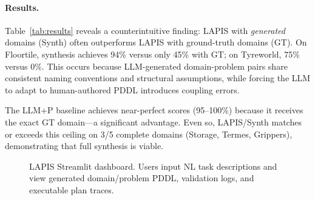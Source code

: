 \documentclass[letterpaper]{article}
\begin{document}
\paragraph{Results.}
Table~\ref{tab:results} reveals a counterintuitive finding: LAPIS with \emph{generated} domains (Synth) often outperforms LAPIS with ground-truth domains (GT). On Floortile, synthesis achieves 94\% versus only 45\% with GT; on Tyreworld, 75\% versus 0\%. This occurs because LLM-generated domain-problem pairs share consistent naming conventions and structural assumptions, while forcing the LLM to adapt to human-authored PDDL introduces coupling errors.

The LLM+P baseline achieves near-perfect scores (95--100\%) because it receives the exact GT domain---a significant advantage. Even so, LAPIS/Synth matches or exceeds this ceiling on 3/5 complete domains (Storage, Termes, Grippers), demonstrating that full synthesis is viable.



\begin{figure}[t]
  \centering
  \caption{LAPIS Streamlit dashboard. Users input NL task descriptions and view generated domain/problem PDDL, validation logs, and executable plan traces.}
  \label{fig:demo}
\end{figure}
\end{document}
